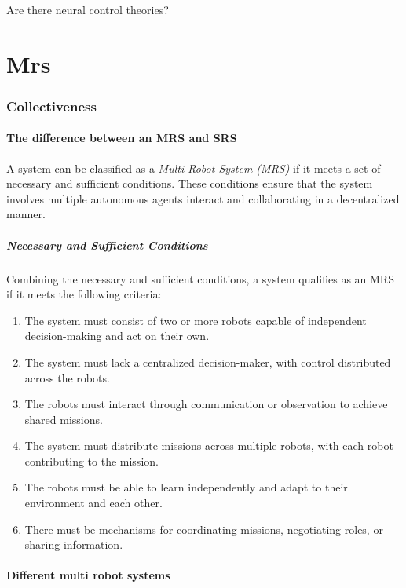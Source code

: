 \documentclass{book}
\begin{document}
Are there neural control theories?

\section{Mrs}


\subsubsection{Collectiveness}


\paragraph{The difference between an MRS and SRS}
A system can be classified as a \textit{Multi-Robot System (MRS)} if it meets a set of necessary and sufficient conditions. These conditions ensure that the system involves multiple autonomous agents interact and collaborating in a decentralized manner.

\subparagraph{Necessary and Sufficient Conditions}
Combining the necessary and sufficient conditions, a system qualifies as an MRS if it meets the following criteria:

\begin{enumerate}
    \item The system must consist of two or more robots capable of independent decision-making and act on their own.
    \item The system must lack a centralized decision-maker, with control distributed across the robots. 
    \item The robots must interact through communication or observation to achieve shared missions.
    \item The system must distribute missions across multiple robots, with each robot contributing to the mission.
    \item The robots must be able to learn independently and adapt to their environment and each other. 
    \item There must be mechanisms for coordinating missions, negotiating roles, or sharing information.
\end{enumerate}


\paragraph{Different multi robot systems}
\end{document}
